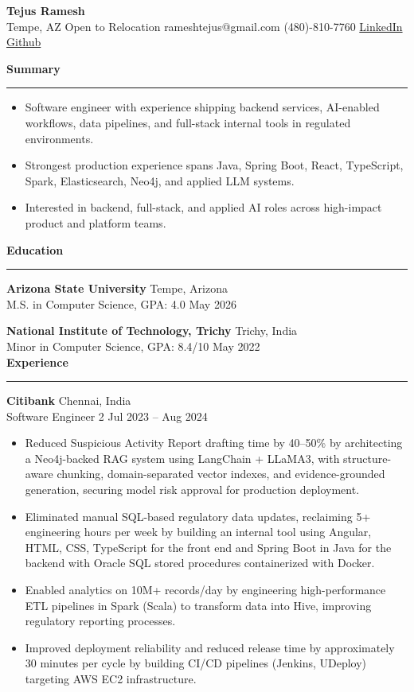 \documentclass[10pt]{article}
\newcommand{\resumeSection}[1]{{\large\textbf{#1}}\par\vspace{0.18em}\hrule\vspace{0.4em}}
\newcommand{\resumeEntry}[4]{
  \textbf{#1} \hfill #2 \\
  #3 \hfill #4 \\
}
\begin{document}
\begin{center}
{\LARGE\textbf{Tejus Ramesh}} \\
Tempe, AZ \textbar{} Open to Relocation \textbar{} rameshtejus@gmail.com \textbar{} (480)-810-7760 \textbar{} \href{https://www.linkedin.com}{LinkedIn} \textbar{} \href{https://github.com}{Github}
\end{center}

\vspace{0.35em}
\resumeSection{Summary}
\begin{itemize}
\item Software engineer with experience shipping backend services, AI-enabled workflows, data pipelines, and full-stack internal tools in regulated environments.
\item Strongest production experience spans Java, Spring Boot, React, TypeScript, Spark, Elasticsearch, Neo4j, and applied LLM systems.
\item Interested in backend, full-stack, and applied AI roles across high-impact product and platform teams.
\end{itemize}

\resumeSection{Education}
\resumeEntry{Arizona State University}{Tempe, Arizona}{M.S. in Computer Science, GPA: 4.0}{May 2026}
\vspace{0.2em}
\resumeEntry{National Institute of Technology, Trichy}{Trichy, India}{Minor in Computer Science, GPA: 8.4/10}{May 2022}

\vspace{0.3em}
\resumeSection{Experience}
\resumeEntry{Citibank}{Chennai, India}{Software Engineer 2}{Jul 2023 -- Aug 2024}
\begin{itemize}
\item Reduced Suspicious Activity Report drafting time by 40--50\% by architecting a Neo4j-backed RAG system using LangChain + LLaMA3, with structure-aware chunking, domain-separated vector indexes, and evidence-grounded generation, securing model risk approval for production deployment.
\item Eliminated manual SQL-based regulatory data updates, reclaiming 5+ engineering hours per week by building an internal tool using Angular, HTML, CSS, TypeScript for the front end and Spring Boot in Java for the backend with Oracle SQL stored procedures containerized with Docker.
\item Enabled analytics on 10M+ records/day by engineering high-performance ETL pipelines in Spark (Scala) to transform data into Hive, improving regulatory reporting processes.
\item Improved deployment reliability and reduced release time by approximately 30 minutes per cycle by building CI/CD pipelines (Jenkins, UDeploy) targeting AWS EC2 infrastructure.
\end{itemize}
\end{document}
